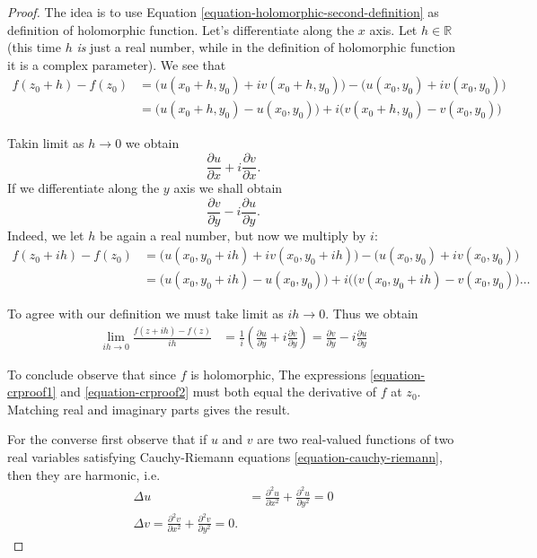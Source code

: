 \begin{proof}
The idea is to use Equation \ref{equation-holomorphic-second-definition}
as definition of holomorphic function. 
Let's differentiate along the $x$ axis.
Let $h \in \mathbb{R}$
(this time $h$ {\it is} just a real number,
while in the definition of holomorphic function
it is a complex parameter).
We see that
\begin{align*}
f(z_0+h)-f(z_0)&=\Big(u(x_0+h,y_0)+iv(x_0+h,y_0)\Big)-\Big(u(x_0,y_0)+iv(x_0,y_0)\Big)\\
&=\Big(u(x_0+h,y_0)-u(x_0,y_0)\Big)+i\Big(v(x_0+h,y_0)-v(x_0,y_0)\Big)
\end{align*}

\noindent
Takin limit as $h \to 0$ we obtain
\begin{equation}
\label{equation-crproof1}
\frac{\partial u}{\partial x}+i\frac{\partial v}{\partial x}.
\end{equation}
If we differentiate along the $y$ axis we shall obtain
\begin{equation}
\label{equation-crproof2}
\frac{\partial v}{\partial y}-i\frac{\partial u}{\partial y}.
\end{equation}
Indeed, we let $h$ be again a real number,
but now we multiply by $i$:
\begin{align*}
f(z_0+ih)-f(z_0)&=\Big(u(x_0,y_0+ih)+iv(x_0,y_0+ih)\Big)-\Big(u(x_0,y_0)+iv(x_0,y_0)\Big)\\
&=\Big(u(x_0,y_0+ih)-u(x_0,y_0)\Big)+i\Big((v(x_0,y_0+ih)-v(x_0,y_0)\Big)\ldots
\end{align*}

\noindent
To agree with our definition we must take limit as $ih \to 0$.
Thus we obtain
\begin{align*}
\lim_{ih \to 0}\frac{f(z+ih)-f(z)}{ih}
&=\frac{1}{i}\left(\frac{\partial u}{\partial y}+i\frac{\partial v}{\partial y}\right)
=\frac{\partial v}{\partial y}-i\frac{\partial u}{\partial y}
\end{align*}

\noindent
To conclude observe that since $f$ is holomorphic,
The expressions \ref{equation-crproof1} and  \ref{equation-crproof2}
must both equal the derivative of $f$ at $z_0$.
Matching real and imaginary parts gives the result.

\medskip\noindent
For the converse first observe that if $u$ and $v$
are two real-valued functions of two real variables
satisfying Cauchy-Riemann equations \ref{equation-cauchy-riemann},
then they are harmonic, i.e.
\begin{align*}
\Delta u&=\frac{\partial^2 u}{\partial x^2}+
\frac{\partial^2 u}{\partial y^2}=0\\
\Delta v=\frac{\partial^2 v}{\partial x^2}+
\frac{\partial^2v}{\partial y^2}=0.
\end{align*}


\end{proof}
